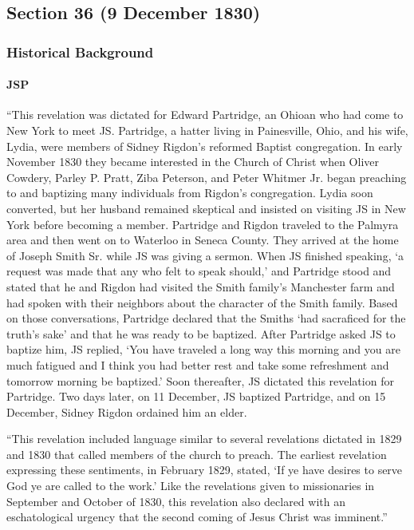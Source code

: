 \subsection{Section 36 (9 December 1830)}
	\label{DC36}
	
	\subsubsection{Historical Background}
		\label{DC36-HB}
		
		\paragraph{JSP}
		
			``This revelation was dictated for Edward Partridge, an Ohioan who had come to New York to meet JS. Partridge, a hatter living in Painesville, Ohio, and his wife, Lydia, were members of Sidney Rigdon's reformed Baptist congregation. In early November 1830 they became interested in the Church of Christ when Oliver Cowdery, Parley P. Pratt, Ziba Peterson, and Peter Whitmer Jr. began preaching to and baptizing many individuals from Rigdon's congregation. Lydia soon converted, but her husband remained skeptical and insisted on visiting JS in New York before becoming a member. Partridge and Rigdon traveled to the Palmyra area and then went on to Waterloo in Seneca County. They arrived at the home of Joseph Smith Sr. while JS was giving a sermon. When JS finished speaking, `a request was made that any who felt to speak should,' and Partridge stood and stated that he and Rigdon had visited the Smith family's Manchester farm and had spoken with their neighbors about the character of the Smith family. Based on those conversations, Partridge declared that the Smiths `had sacraficed for the truth's sake' and that he was ready to be baptized. After Partridge asked JS to baptize him, JS replied, `You have traveled a long way this morning and you are much fatigued and I think you had better rest and take some refreshment and tomorrow morning be baptized.' Soon thereafter, JS dictated this revelation for Partridge. Two days later, on 11 December, JS baptized Partridge, and on 15 December, Sidney Rigdon ordained him an elder.
			
			``This revelation included language similar to several revelations dictated in 1829 and 1830 that called members of the church to preach. The earliest revelation expressing these sentiments, in February 1829, stated, `If ye have desires to serve God ye are called to the work.' Like the revelations given to missionaries in September and October of 1830, this revelation also declared with an eschatological urgency that the second coming of Jesus Christ was imminent.''
			
